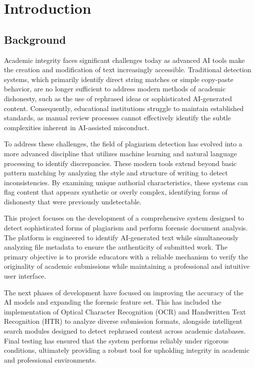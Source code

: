 \documentclass[12pt, a4paper]{report}
\numberwithin{equation}{chapter}
\begin{document}
\newpage

\setcounter{page}{1}

\chapter{Introduction}

\section{Background}

Academic integrity faces significant challenges today as advanced AI tools make the creation and modification of text increasingly accessible. Traditional detection systems, which primarily identify direct string matches or simple copy-paste behavior, are no longer sufficient to address modern methods of academic dishonesty, such as the use of rephrased ideas or sophisticated AI-generated content. Consequently, educational institutions struggle to maintain established standards, as manual review processes cannot effectively identify the subtle complexities inherent in AI-assisted misconduct.

To address these challenges, the field of plagiarism detection has evolved into a more advanced discipline that utilizes machine learning and natural language processing to identify discrepancies. These modern tools extend beyond basic pattern matching by analyzing the style and structure of writing to detect inconsistencies. By examining unique authorial characteristics, these systems can flag content that appears synthetic or overly complex, identifying forms of dishonesty that were previously undetectable.

This project focuses on the development of a comprehensive system designed to detect sophisticated forms of plagiarism and perform forensic document analysis. The platform is engineered to identify AI-generated text while simultaneously analyzing file metadata to ensure the authenticity of submitted work. The primary objective is to provide educators with a reliable mechanism to verify the originality of academic submissions while maintaining a professional and intuitive user interface.

The next phases of development have focused on improving the accuracy of the AI models and expanding the forensic feature set. This has included the implementation of Optical Character Recognition (OCR) and Handwritten Text Recognition (HTR) to analyze diverse submission formats, alongside intelligent search modules designed to detect rephrased content across academic databases. Final testing has ensured that the system performs reliably under rigorous conditions, ultimately providing a robust tool for upholding integrity in academic and professional environments.
\end{document}
